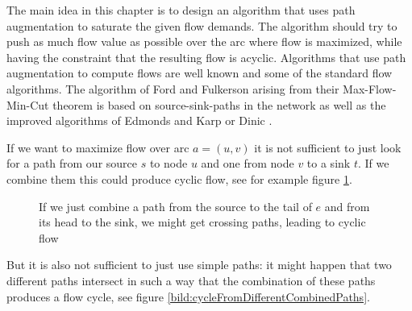 The main idea in this chapter is to design an algorithm that uses path augmentation to saturate the given flow demands. 
The algorithm should try to push as much flow value as possible over the arc where flow is maximized, while having the 
constraint that the resulting flow is acyclic. %
Algorithms that use path augmentation to compute flows are well known and some of the standard flow algorithms. The 
algorithm of Ford and Fulkerson \cite{Ford-Fulkerson_algo} arising from their Max-Flow-Min-Cut theorem is based on 
source-sink-paths in the network as well as the improved algorithms of Edmonds and Karp \cite{EdmondsKarp1972} or Dinic 
\cite{Dinic1970}. 

If we want to maximize flow over arc $a=(u,v)$ it is not sufficient to just look for a path from our source $s$ to node 
$u$ and one from node $v$ to a sink $t$. If we combine them this could produce cyclic flow, see for example figure 
\ref{bild:cycleFromCombinedPaths}. %

\begin{figure}[h!]
\centering
{}
\caption{If we just combine a path from the source to the tail of $e$ and from its head to the sink, we might get 
crossing paths, leading to cyclic flow}
 \label{bild:cycleFromCombinedPaths}
\end{figure}

But it is also not sufficient to just use simple paths: it might happen that two different paths intersect in 
such a way that the combination of these paths produces a flow cycle, see figure 
\ref{bild:cycleFromDifferentCombinedPaths}.


